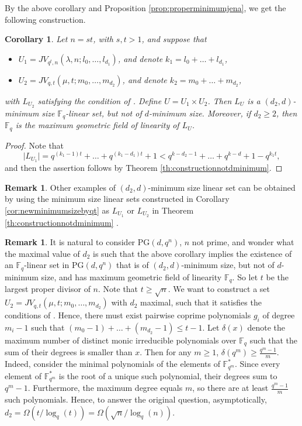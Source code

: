 \documentclass[11pt]{article}
\newtheorem{corollary}[theorem]{Corollary}
\theoremstyle{definition}
\newtheorem{remark}[theorem]{Remark}
\newcommand{\F}{{\mathbb F}}
\newcommand{\fq}{{\mathbb F}_{q}}
\newcommand{\PG}{\mathrm{PG}}
\begin{document}
By the above corollary and Proposition \ref{prop:properminimumjena}, we get the following construction.

\begin{corollary}
 \label{cor:underboundwithjena}
Let $n=st$, with $s,t>1$, and suppose that
\begin{itemize}
 \item $U_1 = JV_{q^t,n}(\lambda,n;l_0,\dots,l_{d_1})$, and denote $k_1 = l_0 + \ldots + l_{d_1}$,
 \item $U_2 = JV_{q,t}(\mu,t;m_0,\dots,m_{d_2})$, and denote $k_2 = m_0 + \ldots + m_{d_2}$,
\end{itemize}
with $L_{U_2}$ satisfying the condition of .
Define $U = U_1 \times U_2$.
Then $L_U$ is a $(d_2,d)$-minimum size $\fq$-linear set, but not of $d$-minimum size.
Moreover, if $d_2 \geq 2$, then $\fq$ is the maximum geometric field of linearity of $L_U$.
\end{corollary}

\begin{proof}
Note that
\[
 \lvert L_{U_1} \rvert = q^{(k_1-1) t}+\ldots+q^{(k_1-d_1)t}+1
 < q^{k-d_2-1}+\ldots+q^{k-d}+1 - q^{k_1 t},
\]
and then the assertion follows by Theorem \ref{th:constructionnotdminimum}.
\end{proof}




\begin{remark}
Other examples of $(d_2,d)$-minimum size linear set can be obtained by using the minimum size linear sets constructed in Corollary \ref{cor:newminimumsizebyqt} as $L_{U_1}$ or $L_{U_2}$ in Theorem \ref{th:constructionnotdminimum} .
\end{remark}

\begin{remark}
 It is natural to consider $\PG(d,q^n)$, $n$ not prime, and wonder what the maximal value of $d_2$ is such that the above corollary implies the existence of an $\fq$-linear set in $\PG(d,q^n)$ that is of $(d_2,d)$-minimum size, but not of $d$-minimum size, and has maximum geometric field of linearity $\fq$.
 So let $t$ be the largest proper divisor of $n$.
 Note that $t \geq \sqrt n$.
 We want to construct a set $U_2 = JV_{q,t}(\mu,t;m_0,\dots,m_{d_2})$ with $d_2$ maximal, such that it satisfies the conditions of .
 Hence, there must exist pairwise coprime polynomials $g_i$ of degree $m_i-1$ such that $(m_0-1) + \ldots + (m_{d_2}-1) \leq t-1$.
 Let $\delta(x)$ denote the maximum number of distinct monic irreducible polynomials over $\fq$ such that the sum of their degrees is smaller than $x$.
 Then for any $m \geq 1$, $\delta(q^m) \geq \frac{q^m-1}m$.
 Indeed, consider the minimal polynomials of the elements of $\F_{q^m}^*$.
 Since every element of $\F_{q^m}^*$ is the root of a unique such polynomial, their degrees sum to $q^m-1$.
 Furthermore, the maximum degree equals $m$, so there are at least $\frac{q^m-1}m$ such polynomials.
 Hence, to answer the original question, asymptotically, $d_2 = \Omega(t/\log_q(t)) = \Omega(\sqrt n / \log_q(n))$.
\end{remark}
\end{document}
